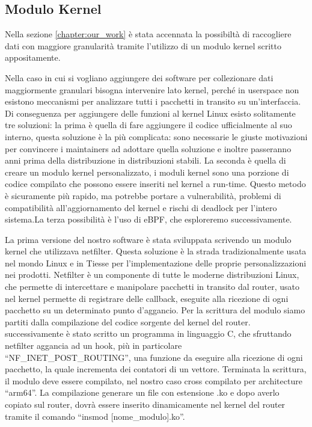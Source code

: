 \subsection{Modulo Kernel}

Nella sezione \ref{chapter:our_work} è stata accennata la possibiltà di raccogliere dati con maggiore granularità tramite l'utilizzo di un modulo kernel scritto appositamente.

Nella caso in cui si vogliano aggiungere dei software per collezionare dati maggiormente granulari bisogna intervenire lato kernel, perché in userspace non esistono meccanismi per analizzare tutti i pacchetti in transito su un'interfaccia. Di conseguenza per aggiungere delle funzioni al kernel Linux esisto solitamente tre soluzioni: la prima è quella di fare aggiungere il codice ufficialmente al suo interno, questa soluzione è la più complicata: sono necessarie le giuste motivazioni per convincere i maintainers ad adottare quella soluzione e inoltre passeranno anni prima della distribuzione in distribuzioni stabili. La seconda è quella di creare un modulo kernel personalizzato, i moduli kernel sono una porzione di codice compilato che possono essere inseriti nel kernel a run-time. Questo metodo è sicuramente più rapido, ma potrebbe portare a vulnerabilità, problemi di compatibilità all'aggiornamento del kernel e rischi di deadlock per l'intero sistema.La terza possibilità è l'uso di eBPF, che esploreremo successivamente.

La prima versione del nostro software è stata sviluppata scrivendo un modulo kernel che utilizzava netfilter. Questa soluzione è la strada tradizionalmente usata nel mondo Linux e in Tiesse per l'implementazione delle proprie personalizzazioni nei prodotti.
Netfilter è un componente di tutte le moderne distribuzioni Linux, che permette di intercettare e manipolare pacchetti in transito dal router, usato nel kernel permette di registrare delle callback, eseguite alla ricezione di ogni pacchetto su un determinato punto d'aggancio.
Per la scrittura del modulo siamo partiti dalla compilazione del codice sorgente del kernel del router. successivamente è stato scritto un programma in linguaggio C, che sfruttando netfilter aggancia ad un hook, più in particolare ``NF\_INET\_POST\_ROUTING'', una funzione da eseguire alla ricezione di ogni pacchetto, la quale incrementa dei contatori di un vettore.
Terminata la scrittura, il modulo deve essere compilato, nel nostro caso cross compilato per architecture ``arm64''. La compilazione generare un file con estensione .ko e dopo averlo copiato sul router, dovrà essere inserito dinamicamente nel kernel del router tramite il comando ``insmod [nome\_modulo].ko''.

